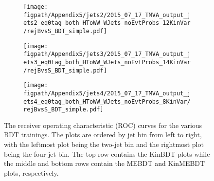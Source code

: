 \begin{figure}[!hbt]
    \begin{subfigure}[t]{0.316\textwidth}
        \texttt{[image: \\figpath/Appendix5/jets2/2015\_07\_17\_TMVA\_output\_jets2\_eq0tag\_both\_HToWW\_WJets\_noEvtProbs\_12KinVar/rejBvsS\_BDT\_simple.pdf]}
        \caption{}
        \label{fig:KinMEBDT_ROC_jets2}
    \end{subfigure}
    \begin{subfigure}[t]{0.316\textwidth}
        \texttt{[image: \\figpath/Appendix5/jets3/2015\_07\_17\_TMVA\_output\_jets3\_eq0tag\_both\_HToWW\_WJets\_noEvtProbs\_14KinVar/rejBvsS\_BDT\_simple.pdf]}
        \caption{}
        \label{fig:KinMEBDT_ROC_jets3}
    \end{subfigure}
    \begin{subfigure}[t]{0.316\textwidth}
        \texttt{[image: \\figpath/Appendix5/jets4/2015\_07\_17\_TMVA\_output\_jets4\_eq0tag\_both\_HToWW\_WJets\_noEvtProbs\_8KinVar/rejBvsS\_BDT\_simple.pdf]}
        \caption{}
        \label{fig:KinMEBDT_ROC_jets4}
    \end{subfigure}
    \caption{The receiver operating characteristic (ROC) curves for the various BDT trainings. The plots are ordered by jet bin from left to right, with the leftmost plot being the two-jet bin and the rightmost plot being the four-jet bin. The top row contains the KinBDT plots while the middle and bottom rows contain the MEBDT and KinMEBDT plots, respectively.}
    \label{fig:BDT_ROC_all}
\end{figure}




\clearpage
